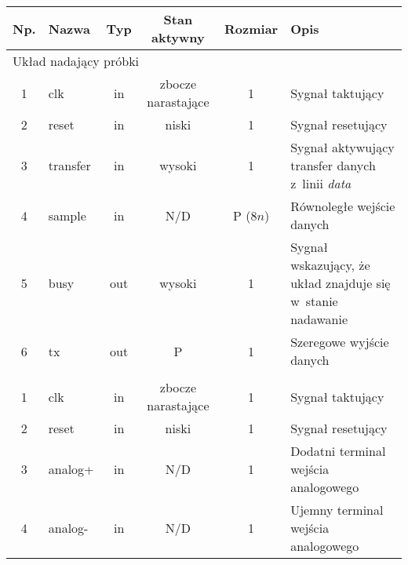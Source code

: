 \setcounter{table}{0}
\begin{table}[t]
\small
\centering
\begin{tabular}{|c|l|c|c|c|m{4.5cm}|}
\hline
\rowcolor[HTML]{C0C0C0}
\textbf{Np.} & \textbf{Nazwa} & \textbf{Typ} & \textbf{Stan aktywny} & \textbf{Rozmiar} & \textbf{Opis}                                                      \\ \hline
\multicolumn{6}{|l|}{\cellcolor[HTML]{F8A102}Układ nadający próbki} \\ \hline
1            & clk            & in           & zbocze narastające    & 1                & Sygnał taktujący                                                   \\ \hline
2            & reset          & in           & niski                 & 1                & Sygnał resetujący                                                  \\ \hline
3            & transfer       & in           & wysoki                & 1                & Sygnał aktywujący transfer danych z~linii \textit{data}            \\ \hline
4            & sample         & in           & N/D                   & P ($8n$)         & Równoległe wejście danych                                          \\ \hline
5            & busy           & out          & wysoki                & 1                & Sygnał wskazujący, że układ znajduje się w~stanie nadawanie        \\ \hline
6            & tx             & out          & P                     & 1                & Szeregowe wyjście danych                                           \\ \hline
\rowcolor[HTML]{32CB00}\multicolumn{6}{|l|}{Moduł analogowy} \\ \hline
1            & clk            & in           & zbocze narastające    & 1                 & Sygnał taktujący                                                  \\ \hline
2            & reset          & in           & niski                 & 1                 & Sygnał resetujący                                                 \\ \hline
3            & analog+        & in           & N/D                   & 1                 & Dodatni terminal wejścia analogowego                              \\ \hline
4            & analog-        & in           & N/D                   & 1                 & Ujemny terminal wejścia analogowego                               \\ \hline

\end{tabular}
\end{table}
